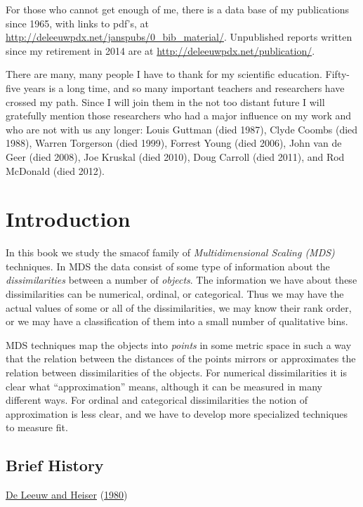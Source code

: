 \documentclass[
  12pt,
]{book}
\theoremstyle{definition}
\theoremstyle{definition}
\theoremstyle{definition}
\theoremstyle{definition}
\theoremstyle{remark}
\begin{document}
For those who cannot get enough of me, there is a data base of my
publications since 1965, with links to pdf's, at
\url{http://deleeuwpdx.net/janspubs/0_bib_material/}. Unpublished reports
written since my retirement in 2014 are at
\url{http://deleeuwpdx.net/publication/}.

There are many, many people I have to thank for my scientific education.
Fifty-five years is a long time, and so many important teachers and
researchers have crossed my path. Since I will join them in the not too
distant future I will gratefully mention those researchers who had a
major influence on my work and who are not with us any longer: Louis
Guttman (died 1987), Clyde Coombs (died 1988), Warren Torgerson (died 1999),
Forrest Young (died 2006), John van de Geer (died 2008), Joe Kruskal (died 2010),
Doug Carroll (died 2011), and Rod McDonald (died 2012).

\hypertarget{intro}{%
\chapter{Introduction}\label{intro}}

In this book we study the \(\textrm{smacof}\) family of \emph{Multidimensional Scaling (MDS)} techniques. In MDS the data consist of some type of
information about the \emph{dissimilarities} between a number of \emph{objects}.
The information we have about these dissimilarities can be numerical,
ordinal, or categorical. Thus we may have the actual values of some or
all of the dissimilarities, we may know their rank order, or we may have
a classification of them into a small number of qualitative bins.

MDS techniques map the objects into \emph{points} in some metric space in such a
way that the relation between the distances of the points mirrors
or approximates the relation between dissimilarities of the objects. For
numerical dissimilarities it is clear what ``approximation'' means,
although it can be measured in many different ways. For ordinal and
categorical dissimilarities the notion of approximation is less clear,
and we have to develop more specialized techniques to measure fit.

\hypertarget{introhist}{%
\section{Brief History}\label{introhist}}

\protect\hyperlink{ref-deleeuw_heiser_C_80}{De Leeuw and Heiser} (\protect\hyperlink{ref-deleeuw_heiser_C_80}{1980})
\end{document}
